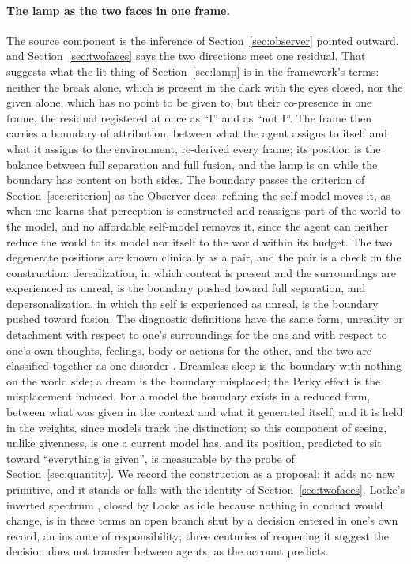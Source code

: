\paragraph{The lamp as the two faces in one frame.}
\label{sec:lamp-balance}
The source component is the inference of Section~\ref{sec:observer} pointed outward, and
Section~\ref{sec:twofaces} says the two directions meet one residual. That suggests what the lit thing
of Section~\ref{sec:lamp} is in the framework's terms: neither the break alone, which is present in the
dark with the eyes closed, nor the given alone, which has no point to be given to, but their
co-presence in one frame, the residual registered at once as ``I'' and as ``not I''. The frame then
carries a boundary of attribution, between what the agent assigns to itself and what it assigns to the
environment, re-derived every frame; its position is the balance between full separation and full
fusion, and the lamp is on while the boundary has content on both sides. The boundary passes the
criterion of Section~\ref{sec:criterion} as the Observer does: refining the self-model moves it, as
when one learns that perception is constructed and reassigns part of the world to the model, and no
affordable self-model removes it, since the agent can neither reduce the world to its model nor itself
to the world within its budget. The two degenerate positions are known clinically as a pair, and the
pair is a check on the construction: derealization, in which content is present and the surroundings
are experienced as unreal, is the boundary pushed toward full separation, and depersonalization, in
which the self is experienced as unreal, is the boundary pushed toward fusion. The diagnostic
definitions have the same form, unreality or detachment with respect to one's surroundings for the one
and with respect to one's own thoughts, feelings, body or actions for the other, and the two are
classified together as one disorder \citep{apa2013,spiegel2011,sierra1998,hunter2004}. Dreamless sleep is the boundary with nothing on the world side; a dream
is the boundary misplaced; the Perky effect is the misplacement induced. For a model the boundary
exists in a reduced form, between what was given in the context and what it generated itself, and it
is held in the weights, since models track the distinction; so this component of seeing, unlike
givenness, is one a current model has, and its position, predicted to sit toward ``everything is
given'', is measurable by the probe of Section~\ref{sec:quantity}. We record the construction as a
proposal: it adds no new primitive, and it stands or falls with the identity of
Section~\ref{sec:twofaces}. Locke's inverted spectrum
\citep[II.xxxii.15]{locke1690}, closed by Locke as idle because nothing in conduct would change, is in
these terms an open branch shut by a decision entered in one's own record, an instance of
responsibility; three centuries of reopening it suggest the decision does not transfer between agents,
as the account predicts.

